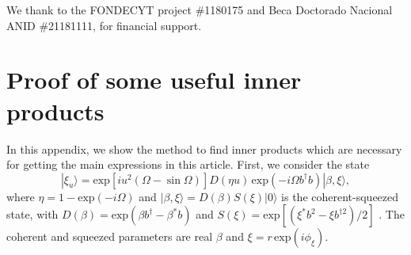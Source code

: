 \begin{acknowledgments}
	We thank to the FONDECYT project \#1180175 and Beca Doctorado Nacional ANID \#21181111, for financial support.
\end{acknowledgments}
   
\appendix\label{ap}
\section{Proof of some useful inner products}\label{ap1}
In this appendix, we show the method to find inner products which are necessary for getting the main expressions in this article. First, we consider the state
\begin{equation}
|\xi_{u}\rangle=\textrm{exp}\left[iu^{2}\left(\Omega-\sin\Omega\right)\right]D(\eta u)\,\textrm{exp}\left(-i\Omega b^{\dagger}b\right)|\beta,\xi\rangle,
\end{equation}
where $\eta=1-\textrm{exp}\left(-i\Omega\right)$ and $|\beta,\xi\rangle=D\left(\beta\right)S\left(\xi\right)|0\rangle$ is the coherent-squeezed state, with $D(\beta)=\textrm{exp}\left(\beta b^{\dagger}-\beta^{*}b\right)$ and $S(\xi)=\textrm{exp}\left[\left(\xi^{*}b^{2}-\xi b^{\dagger 2}\right)/2\right]$ \cite{glauber1963coherent, gerry2005introductory}. The coherent and squeezed parameters are real $\beta$ and $\xi=r\,\textrm{exp}(i\phi_{\xi})$.


